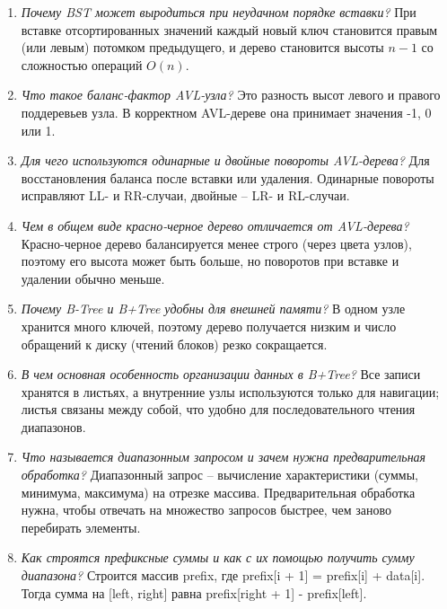 \begin{enumerate}
	\item \textit{Почему BST может выродиться при неудачном порядке вставки?}\newline
	При вставке отсортированных значений каждый новый ключ становится правым (или левым) потомком предыдущего, 
	и дерево становится высоты $n-1$ со сложностью операций $O(n)$.
	
	\item \textit{Что такое баланс-фактор AVL-узла?}\newline
	Это разность высот левого и правого поддеревьев узла. 
	В корректном AVL-дереве она принимает значения -1, 0 или 1.
	
	\item \textit{Для чего используются одинарные и двойные повороты AVL-дерева?}\newline
	Для восстановления баланса после вставки или удаления. 
	Одинарные повороты исправляют LL- и RR-случаи, двойные -- LR- и RL-случаи.
	
	\item \textit{Чем в общем виде красно-черное дерево отличается от AVL-дерева?}\newline
	Красно-черное дерево балансируется менее строго (через цвета узлов), поэтому его высота может быть больше, но поворотов при вставке и удалении обычно меньше.
	
	\item \textit{Почему B-Tree и B+Tree удобны для внешней памяти?}\newline
	В одном узле хранится много ключей, поэтому дерево получается низким и число обращений к диску (чтений блоков) резко сокращается.
	
	\item \textit{В чем основная особенность организации данных в B+Tree?}\newline
	Все записи хранятся в листьях, а внутренние узлы используются только для навигации; листья связаны между собой, что удобно для последовательного чтения диапазонов.
	
	\item \textit{Что называется диапазонным запросом и зачем нужна предварительная обработка?}\newline
	Диапазонный запрос -- вычисление характеристики (суммы, минимума, максимума) на отрезке массива. Предварительная обработка нужна, чтобы отвечать на множество запросов быстрее, чем заново перебирать элементы.
	
	\item \textit{Как строятся префиксные суммы и как с их помощью получить сумму диапазона?}\newline
	Строится массив prefix, где prefix[i + 1] = prefix[i] + data[i]. 
	Тогда сумма на [left, right] равна prefix[right + 1] - prefix[left].
	

\end{enumerate}
